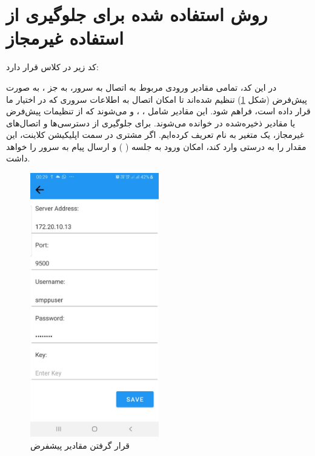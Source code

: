 \documentclass{report}
\begin{document}
\section{روش استفاده شده برای جلوگیری از استفاده غیرمجاز}
کد زیر در کلاس 
قرار دارد:
\begin{latin}
	
	\label{code:Defaults}
\end{latin}
در این کد، تمامی مقادیر ورودی مربوط به اتصال به سرور، به جز
 ، به صورت پیش‌فرض (شکل \ref{fig:Defaults}) تنظیم شده‌اند تا امکان اتصال به اطلاعات سروری که
   در اختیار ما قرار داده است، فراهم شود. این مقادیر شامل
    ،
     ،
       و
        می‌شوند که از تنظیمات پیش‌فرض یا مقادیر ذخیره‌شده در 
        خوانده می‌شوند. برای جلوگیری از دسترسی‌ها و اتصال‌های غیرمجاز، یک متغیر به نام 
         تعریف کرده‌ایم. اگر مشتری در سمت اپلیکیشن کلاینت، این مقدار را به درستی وارد کند، امکان ورود به جلسه (
        ) و ارسال پیام به سرور را خواهد داشت.
\begin{figure}[b]
	\centering
	\includegraphics[width=0.5\textwidth]{Pic/Defaults}
	\caption{قرار گرفتن مقادیر پیشفرض}
	\label{fig:Defaults}
\end{figure}
\end{document}

